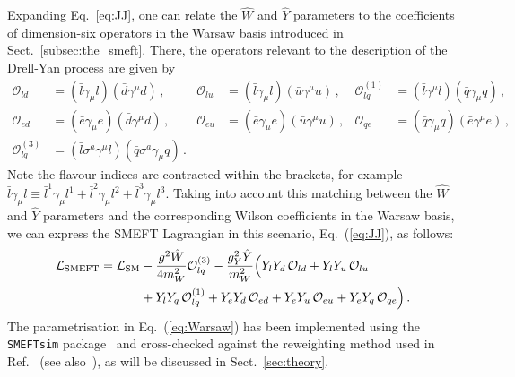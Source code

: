 \documentclass[withindex,glossary]{cam-thesis}
\begin{document}
Expanding Eq.~\eqref{eq:JJ}, one can relate the $\hat{W}$ and $\hat{Y}$ parameters
to the coefficients of dimension-six operators in the Warsaw basis introduced in Sect.~\ref{subsec:the_smeft}.
%
There, the operators  relevant to the description of the Drell-Yan process are given by
\begin{equation}
\begin{aligned}\label{eq:Warsaw}
\mathcal{O}_{ld} &= (\bar  l\gamma_\mu l)(\bar d \gamma^\mu d) \,, 
&
\mathcal{O}_{lu} &= (\bar  l\gamma_\mu l)(\bar u \gamma^\mu u) \,,
&
\mathcal{O}_{lq}^{(1)} &= (\bar l \gamma^\mu l) (\bar  q\gamma_\mu q)\,,   
\\
\mathcal{O}_{ed} &= (\bar  e\gamma_\mu e)(\bar d \gamma^\mu d) \,, 
&
\mathcal{O}_{eu} &= (\bar  e\gamma_\mu e)(\bar u \gamma^\mu u) \,,
&
\mathcal{O}_{qe} &=  (\bar  q\gamma_\mu q) (\bar e \gamma^\mu e)\,,
\\
\mathcal{O}_{lq}^{(3)} &=(\bar l \sigma^a \gamma^\mu l)  (\bar  q \sigma^a \gamma_\mu q) \, .
\end{aligned}
\end{equation}
Note the flavour indices are contracted within the brackets, for example $\bar  l\gamma_\mu l \equiv \bar  l^1 \gamma_\mu l^1 + \bar  l^2 \gamma_\mu l^2 + \bar  l^3 \gamma_\mu l^3$. 
%
Taking into account this matching between the $\hat{W}$ and $\hat{Y}$ parameters
and the corresponding Wilson coefficients
in the Warsaw basis,
we can express the SMEFT Lagrangian in this scenario, Eq.~(\ref{eq:JJ}), as follows:
\begin{align}\label{eq:WYWarsaw}
\mathcal{L}_{\rm SMEFT}=\mathcal{L}_{\rm SM}   &-\frac{g^2 \hat{W}}{4
                                                 m_W^2}
                                                 \mathcal{O}_{lq}^{(3)}
                                                 - \frac{ g_Y^2
                                                 \hat{Y} }{m_W^2}
                                                 \Big(Y_l Y_d \,
                                                 \mathcal{O}_{ld} +
                                                 Y_l Y_u \,
                                                 \mathcal{O}_{lu}
                                                 \nonumber \\&+Y_l Y_q
  \, \mathcal{O}_{lq}^{(1)} + Y_e Y_d \, \mathcal{O}_{ed} + Y_e Y_u \,
  \mathcal{O}_{eu} + Y_e Y_q \, \mathcal{O}_{q e} \Big) \,.
\end{align}
The parametrisation in Eq.~(\ref{eq:Warsaw}) has been implemented using the {\tt SMEFTsim} package~\cite{Brivio:2017btx} and cross-checked against the reweighting method used in Ref.~\cite{Greljo:2017vvb} (see also~\cite{Ricci:2020xre}), as will be discussed in Sect.~\ref{sec:theory}.
\end{document}

